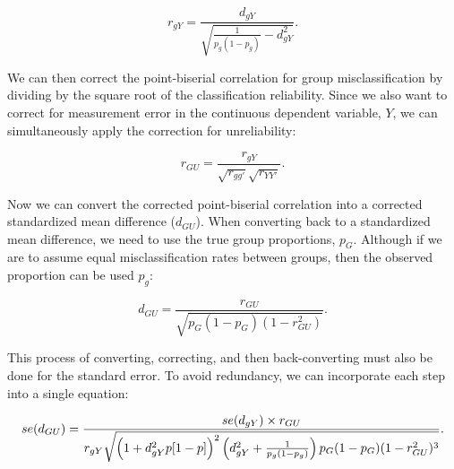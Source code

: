 \documentclass[
  letterpaper,
  DIV=11,
  numbers=noendperiod]{scrreprt}
\begin{document}
\[
r_{gY} = \frac{d_{gY}}{\sqrt{\frac{1}{p_g(1-p_g)}-d_{gY}^2}}.
\]

We can then correct the point-biserial correlation for group
misclassification by dividing by the square root of the classification
reliability. Since we also want to correct for measurement error in the
continuous dependent variable, \(Y\), we can simultaneously apply the
correction for unreliability:

\[
r_{GU} = \frac{r_{gY}}{\sqrt{r_{gg'}}\sqrt{r_{YY'}}}.
\]

Now we can convert the corrected point-biserial correlation into a
corrected standardized mean difference (\(d_{GU}\)). When converting
back to a standardized mean difference, we need to use the true group
proportions, \(p_G\). Although if we are to assume equal
misclassification rates between groups, then the observed proportion can
be used \(p_g\):

\[
d_{GU} = \frac{r_{GU}}{\sqrt{p_G\left(1-p_G\right)\left(1-r_{GU}^2\right)}}.
\]

This process of converting, correcting, and then back-converting must
also be done for the standard error. To avoid redundancy, we can
incorporate each step into a single equation:

\[
\small{se(d_{GU}) = \frac {se(d_{gY})\times r_{GU}} {r_{gY}\sqrt{\left(1+d_{gY}^2p[1-p]\right)^2\left(d_{gY}^2+\frac{1}{p_g(1-p_g)}\right)p_G(1-p_G)(1-r_{GU}^2)^3}}.}
\]
\end{document}
